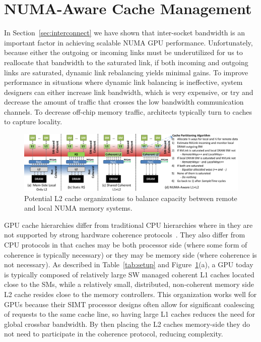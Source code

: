 \section{NUMA-Aware Cache Management}
\label{sec:caches}
In Section~\ref{sec:interconnect} we have shown that inter-socket bandwidth is an
important factor in achieving scalable NUMA GPU performance.
Unfortunately, because either the outgoing or incoming links must be underutilized
for us to reallocate that bandwidth to the saturated link, if both incoming and
outgoing links are saturated, dynamic link rebalancing yields minimal gains.
To improve performance in situations where dynamic link balancing is ineffective,
system designers can either increase link bandwidth, which is very expensive,
or try and decrease the amount of traffic that crosses the low bandwidth
communication channels.  To decrease off-chip memory traffic, architects typically
turn to caches to capture locality.

\begin{figure}[t]
    \centering
    \includegraphics[width=1.0\textwidth]{figures/cache_configurations_static_dynamic.pdf}
    \caption{Potential L2 cache organizations to balance capacity between remote and
    local NUMA memory systems.}
    \label{fig:cacheorg}
            \vspace{-.2in}
\end{figure}

GPU cache hierarchies differ from traditional CPU hierarchies where in they 
are not supported by strong hardware coherence protocols~\cite{Singh2013}. 
They also differ from CPU protocols in that caches may be both processor side 
(where some form of 
coherence is typically necessary) or they may be memory side (where coherence 
is not necessary).  As described in Table~\ref{tab:setup} and
Figure~\ref{fig:cacheorg}(a), a GPU today is typically composed of relatively 
large SW managed coherent L1 caches located close to the SMs, while a relatively small, 
distributed, 
non-coherent memory side L2 cache resides close to the memory controllers.  
This organization works well for GPUs 
because their SIMT processor designs often allow for significant coalescing 
of requests to the same cache line, so having large L1 caches reduces the 
need for global crossbar bandwidth.  By then placing the L2 caches 
memory-side they do not need to participate in the coherence protocol, reducing
complexity.

